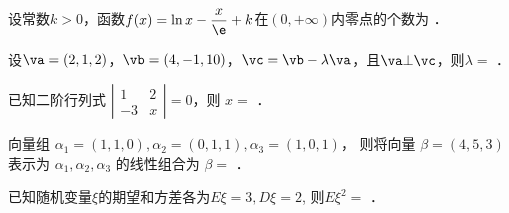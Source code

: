 \documentclass{njustexam}
\begin{document}
\renewcommand{\course}{我是课程名}                          %
\renewcommand{\duration}{100}                                            %
\renewcommand{\credit}{3}                                                   %
\renewcommand{\syllabus}{12345678-9}                               %
\renewcommand{\fullmark}{100}                                            %
\renewcommand{\composer}{张三、李四、王五}            %
\renewcommand{\composedate}{2021年4月28日}                   %
\renewcommand{\validator}{赵六}                                        %
\renewcommand{\coursetype}{1}                                            %
\renewcommand{\exammethod}{1}                                         %
\renewcommand{\testpaper}{A}                                              %

\makehead %


\begin{problem}
设常数$k>0$，函数$f(x)=\ln x-\dfrac{x}{\e}+k$在$(0,+\infty)$内零点的个数为 ．
\end{problem}


\begin{problem}
设$\va=(2,1,2)$，$\vb=(4,-1,10)$，$\vc=\vb-\lambda\va$，且$\va\bot\vc$，则$\lambda=$ ．
\end{problem}


\begin{problem}
已知二阶行列式 $\left|\begin{array}{cc}
  1 & 2\\
  - 3 & x
\end{array}\right|=0$，则 $x=$ ．
\end{problem}


\begin{problem}
向量组 $\alpha_1=(1,1,0), \alpha_2=(0,1,1), \alpha_3=(1,0,1)$，
则将向量 $\beta=(4, 5, 3)$ 表示为 $\alpha_1, \alpha_2, \alpha_3$
的线性组合为 $\beta=$ ．
\end{problem}


\begin{problem}
已知随机变量$\xi$的期望和方差各为$E\xi=3, D\xi=2$, 则$E\xi^2=$ ．
\end{problem}
\end{document}
